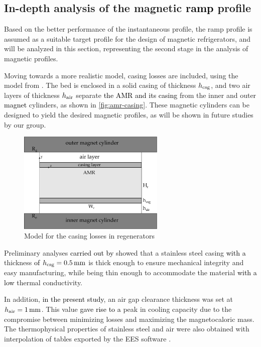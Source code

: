 \documentclass[referee]{svjour3}
\begin{document}
\subsection{In-depth analysis of the  magnetic \textcolor{black}{ramp} profile}
\label{sec:performance-an-amr-1}

Based on the better performance of the instantaneous profile, the ramp profile is assumed as a suitable target profile for the design of magnetic refrigerators, and will be analyzed in this section, representing the second stage in the analysis of magnetic profiles.

Moving towards a more realistic model, casing losses are included, using the model from \cite{bib:trevizoli16_perfor_model}. The bed is enclosed in a solid casing of thickness $h_{\mathrm{csg}}$, and two air layers of thickness $h_{\mathrm{air}}$ separate \textcolor{black}{the AMR and its casing} from the inner and outer \textcolor{black}{magnet} cylinders, as shown in \autoref{fig:amr-casing}. These magnetic cylinders can be designed to yield the desired magnetic profiles, as will be shown in future studies by our group. 

\begin{figure}[!ht]
  \centering
  \includegraphics[width=7cm]{amr-casing}
  \caption{Model for the casing losses in regenerators}
  \label{fig:amr-casing}
\end{figure}


Preliminary analyses \textcolor{black}{carried out by} \cite{bib:peixer17-perfor-amrs} showed that a stainless steel casing \textcolor{black}{with a} thickness \textcolor{black}{of} $h\ped{csg} = \SI{0.5}{\mm}$ is thick enough to ensure mechanical integrity and easy manufacturing, while being thin enough to accommodate the material \textcolor{black}{with a low} thermal conductivity.

In addition, \textcolor{black}{in the present study}, an air gap clearance thickness was set at $h\ped{air} = \SI{1}{\mm}$. This value \textcolor{black}{gave rise to a} peak in cooling capacity due to the compromise between minimizing losses and maximizing the magnetocaloric mass.  The thermophysical properties of stainless steel and air were also obtained with interpolation of tables exported by the EES software \cite{bib:klein13-ees}.
\end{document}

